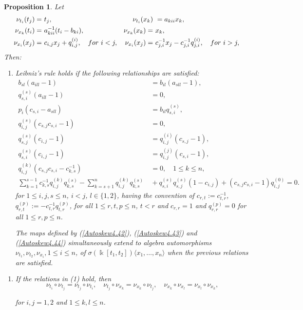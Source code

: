 \documentclass{amsart}
\newtheorem{proposition}[theorem]{Proposition}
\theoremstyle{definition}
\theoremstyle{remark}
\numberwithin{equation}{section}
\begin{document}
\begin{proposition}\label{autoSkewPBW2n} 
Let
\begin{align}
   \nu_{t_i}(t_j) = &\ t_j, & \nu_{t_i}(x_k) &\ = a_{kii}x_k, \label{Autoskew4.42} \\
   \nu_{x_k}(t_i) = &\ a_{kii}^{-1}(t_i-b_{ki}),   &  \nu_{x_k}(x_k) = &\ x_k, \label{Autoskew4.43} \\
   \nu_{x_i}(x_j) = &\ c_{i,j}x_j+q_{i,j}^{(i)}, \quad {\rm for}\ i < j, & \nu_{x_i}(x_j) = &\ c_{j,i}^{-1}x_j-c_{j,i}^{-1}q_{j,i}^{(i)},  \quad {\rm for}\ i > j,  \label{Autoskew4.44}   
\end{align}
Then:
\begin{enumerate}
\item [\rm (1)] Leibniz's rule holds if the following relationships are satisfied:
\begin{align}
    b_{sl}(a_{ill}-1) &\ =b_{il}(a_{sll}-1), \label{cond4.56} \\
    q_{s,i}^{(s)}(a_{ill}-1) &\ =0,\label{cond4.57} \\
    p_i(c_{s,i}-a_{sll}) &\ =b_{il}q_{s,i}^{(s)}, \label{cond4.58} \\
    q_{i,j}^{(s)}(c_{s,j}c_{s,i}-1) &\ =0, \label{cond4.59} \\
    q_{s,j}^{(s)}(c_{i,j}-1) &\ = q_{i,j}^{(i)}(c_{s,j}-1), \label{cond4.60} \\
    q_{s,i}^{(s)}(c_{i,j}-1) &\ = q_{i,j}^{(j)}(c_{s,i}-1), \label{cond4.61} \\
    q_{i,j}^{(k)}(c_{s,j}c_{s,i}-c_{k,s}^{-1}) &\ =0, \quad 1\leq k \leq n, \label{cond4.62} \\
     \sum_{k=1}^{s-1}c_{k,s}^{-1}q_{i,j}^{(k)}q_{k,s}^{(s)}-\sum_{k=s+1}^{n}q_{i,j}^{(k)}q_{k,s}^{(s)} &\ 
     +q_{s,i}^{(s)}q_{s,j}^{(s)}(1-c_{i,j})+(c_{s,j}c_{s,i}-1)q_{i,j}^{(0)}  = 0. \label{cond4.63}
\end{align}
for $1 \leq i,j,s \leq n$, $i<j$, $l \in \{1, 2\}$, having the convention of $c_{r,t}:=c_{t,r}^{-1}$, $q_{r,t}^{(p)}:=-c_{t,r}^{-1}q_{t,r}^{(p)}$, for all $1 \leq r,t,p \leq n$, $t<r$ and  $c_{r,r}=1$ and $q_{r,r}^{(p)}=0$ for all $1 \leq r,p \leq n$.

The maps defined by {\rm (}\ref{Autoskew4.42}{\rm )}, {\rm (}\ref{Autoskew4.43}{\rm )} and {\rm (}\ref{Autoskew4.44}{\rm )} simultaneously extend to algebra automorphisms $\nu_{t_1}, \nu_{t_2}, \nu _{x_i},1 \leq i \leq n$, of $\sigma(\Bbbk[t_1, t_2])\langle x_1, \ldots, x_n\rangle$ when the previous relations are satisfied.
\end{enumerate}
\begin{enumerate}
\item [\rm (2)] If the relations in {\rm (1)} hold, then  
\begin{equation}\label{Eq1skew2n}
   \nu_{t_i} \circ \nu_{t_j} = \nu_{t_j} \circ \nu_{t_i}, \quad \nu_{t_j} \circ \nu_{x_k} = \nu_{x_k} \circ \nu_{t_j}, \quad \nu_{x_k} \circ \nu_{x_l} = \nu_{x_l} \circ \nu_{x_k}, 
\end{equation}

for $i, j = 1, 2$ and $1\le k, l \leq n$.
\end{enumerate}
\end{proposition}
\end{document}
